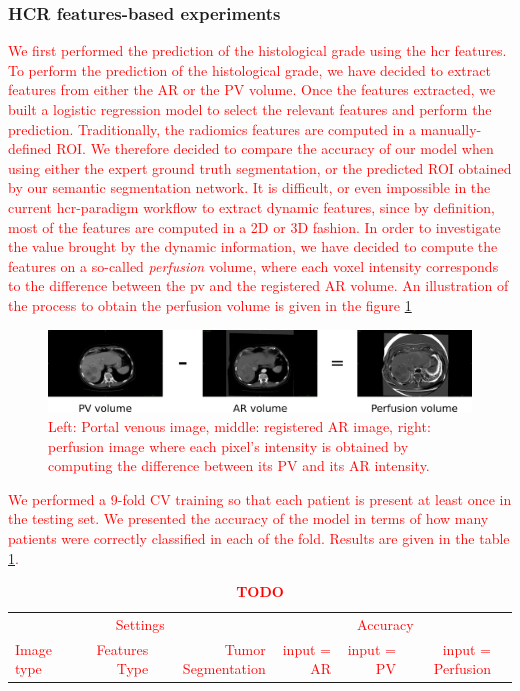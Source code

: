 \subsubsection{HCR features-based experiments}
\textcolor{red}
{
We first performed the prediction of the histological grade using the \ac{hcr} features.
To perform the prediction of the histological grade, we have decided to extract features from either the AR or the PV volume.
Once the features extracted, we built a logistic regression model to select the relevant features and perform the prediction.
Traditionally, the radiomics features are computed in a manually-defined ROI. We therefore decided to compare the accuracy of our model when using either the expert ground truth segmentation, or the predicted ROI obtained by our semantic segmentation network.
It is difficult, or even impossible in the current \ac{hcr}-paradigm workflow to extract dynamic features, since by definition, most of the features are computed in a 2D or 3D fashion. 
In order to investigate the value brought by the dynamic information, we have decided to compute the features on a so-called \textit{perfusion} volume, where each voxel intensity corresponds to the difference between the \ac{pv} and the registered AR volume. An illustration of the process to obtain the perfusion volume is given in the figure \ref{fig:perfusion}
\begin{figure}
\centering
\includegraphics[width=0.7\linewidth]{Contributions/images/perfusion}
\caption{Left: Portal venous image, middle: registered AR image, right: perfusion image where each pixel's intensity is obtained by computing the difference between its PV and its AR intensity.}
\label{fig:perfusion}
\end{figure}
We performed a 9-fold CV training so that each patient is present at least once in the testing set. We presented the accuracy of the model in terms of how many patients were correctly classified in each of the fold. Results are given in the table \ref{tab:hcrGrade}.
\begin{table}[!htp]\centering
\caption{\textbf{TODO}}\label{tab:hcrGrade}
\scriptsize
\begin{tabular}{lrrrrrr}\toprule
\multicolumn{3}{c}{Settings} &\multicolumn{3}{c}{Accuracy} \\\cmidrule{1-6}
Image type &Features Type &Tumor Segmentation &input = AR &input = PV &input = Perfusion \\\midrule

\end{tabular}
\end{table}}
